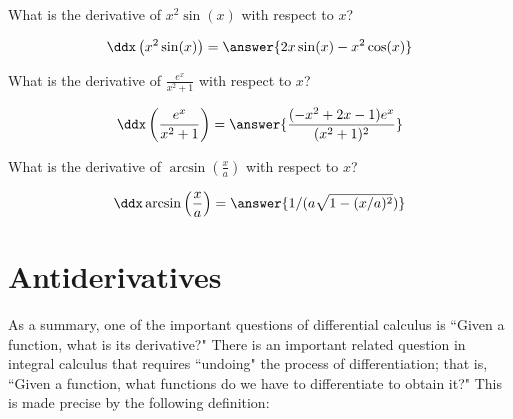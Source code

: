 \documentclass[nooutcomes]{ximera}
\begin{document}
 
\begin{question} 
  What is the derivative of $x^2 \sin(x) $ with respect to $x$?
  \begin{prompt} 
    \[
    \ddx \left(x^2 \sin(x) \right)= \answer{2x \sin(x) -x^2 \cos(x)}
    \]
  \end{prompt}
\end{question}

\begin{question} 
  What is the derivative of $\frac{e^x}{x^2+1}$ with respect to $x$?
  \begin{prompt} 
    \[
    \ddx \left(\frac{e^x}{x^2+1}\right) = \answer{\frac{(- x^2 + 2x -1)e^x}{(x^2+1)^2}}
    \]
  \end{prompt}
\end{question}\begin{question} 
  What is the derivative of $\arcsin\left(\frac{x}{a}\right)$ with respect to $x$?
  \begin{prompt} 
    \[
    \ddx \arcsin\left(\frac{x}{a}\right) = \answer{1/(a \sqrt{1-(x/a)^2})}
    \]
  \end{prompt}
\end{question}







\section{Antiderivatives}


As a summary, one of the important questions of differential calculus is ``Given a function, what is its derivative?"  There is an important related question in integral calculus that requires ``undoing" the process of differentiation; that is, ``Given a function, what functions do we have to differentiate to obtain it?"   This is made precise by the following definition:
\end{document}

